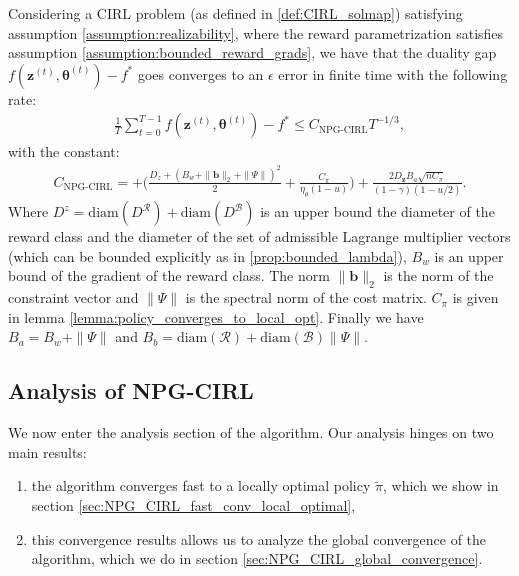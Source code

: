   \begin{theorem}
      \label{thm:global_conv_npg_cirl}
      Considering a CIRL problem (as defined in \ref{def:CIRL_solmap}) satisfying assumption \ref{assumption:realizability}, where the reward parametrization satisfies assumption \ref{assumption:bounded_reward_grads}, we have that the duality gap $f(\bm{z}^{(t)},\bm{\theta}^{(t)}) - f^*$ goes converges to an $\epsilon$ error in finite time with the following rate:
      \begin{align*}
          \frac{1}{T} \sum_{t=0}^{T-1} f(\bm{z}^{(t)},\bm{\theta}^{(t)}) - f^* \leq
          C_\text{NPG-CIRL} T^{-1/3},
      \end{align*}
      with the constant:
      \begin{align*}
          C_\text{NPG-CIRL} =
          +\Bigg(\frac{D_z+(B_w + \|\bm{b}\|_2 + \|\Psi\|)^2}{2} 
          + \frac{C_\pi}{\eta_\theta(1-u)}\Bigg)
          + \frac{2 D_{\bm{z}} B_a\sqrt{n C_\pi}}{(1 - \gamma)(1-u/2)}.
      \end{align*}
      Where $D^z=\text{diam}(D^{\mathcal{R}})+\text{diam}(D^{\mathcal{B}})$ is an upper bound the diameter of the reward class and the diameter of the set of admissible Lagrange multiplier vectors (which can be bounded explicitly as in \ref{prop:bounded_lambda}), $B_w$ is an upper bound of the gradient of the reward class. The norm $\|\bm{b}\|_2$ is the norm of the constraint vector and $\|\Psi\|$ is the spectral norm of the cost matrix. $C_\pi$ is given in lemma \ref{lemma:policy_converges_to_local_opt}. Finally we have $B_a=B_w+\|\Psi\|$ and $B_b=\text{diam}(\mathcal{R})+\text{diam}(\mathcal{B})\|\Psi\|$.
  \end{theorem}

\subsection{Analysis of NPG-CIRL}

We now enter the analysis section of the algorithm. Our analysis hinges on two main results:
\begin{enumerate}
    \item the algorithm converges fast to a locally optimal policy $\tilde{\pi}$, which we show in section \ref{sec:NPG_CIRL_fast_conv_local_optimal},
    \item this convergence results allows us to analyze the global convergence of the algorithm, which we do in section  \ref{sec:NPG_CIRL_global_convergence}.
\end{enumerate}


